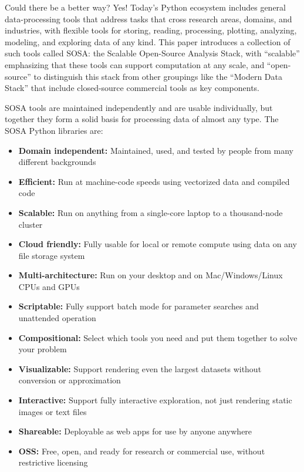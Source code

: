Could there be a better way? Yes! Today's Python ecosystem includes general data-processing tools that address tasks that cross research areas, domains, and industries, with flexible tools for storing, reading, processing, plotting, analyzing, modeling, and exploring data of any kind. This paper introduces a collection of such tools called SOSA: the Scalable Open-Source Analysis Stack, with ``scalable'' emphasizing that these tools can support computation at any scale, and ``open-source'' to distinguish this stack from other groupings like the ``Modern Data Stack'' \cite{handy:dbtb20} that include closed-source commercial tools as key components.

SOSA tools are maintained independently and are usable individually, but together they form a solid basis for processing data of almost any type. The SOSA Python libraries are:

\begin{itemize}
  \item\textbf{Domain independent:} Maintained, used, and tested by people from many different backgrounds
  \item\textbf{Efficient:} Run at machine-code speeds using vectorized data and compiled code
  \item\textbf{Scalable:} Run on anything from a single-core laptop to a thousand-node cluster
  \item\textbf{Cloud friendly:} Fully usable for local or remote compute using data on any file storage system
  \item\textbf{Multi-architecture:} Run on your desktop and on Mac/Windows/Linux CPUs and GPUs
  \item\textbf{Scriptable:} Fully support batch mode for parameter searches and unattended operation
  \item\textbf{Compositional:} Select which tools you need and put them together to solve your problem
  \item\textbf{Visualizable:} Support rendering even the largest datasets without conversion or approximation
  \item\textbf{Interactive:} Support fully interactive exploration, not just rendering static images or text files
  \item\textbf{Shareable:} Deployable as web apps for use by anyone anywhere
  \item\textbf{OSS:} Free, open, and ready for research or commercial use, without restrictive licensing
\end{itemize}

